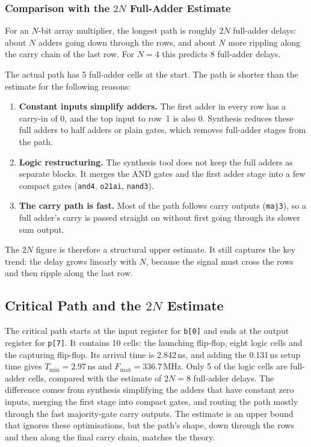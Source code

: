 \documentclass[11pt,a4paper]{article}
\begin{document}
\subsubsection{Comparison with the $2N$ Full-Adder Estimate}

For an $N$-bit array multiplier, the longest path is roughly $2N$ full-adder
delays: about $N$ adders going down through the rows, and about $N$ more
rippling along the carry chain of the last row. For $N = 4$ this predicts
8 full-adder delays.

The actual path has 5 full-adder cells at the start. The path is shorter than the estimate for the following reasons:
\begin{enumerate}
  \item \textbf{Constant inputs simplify adders.} The first adder in every
        row has a carry-in of 0, and the top input to row~1 is also 0.
        Synthesis reduces these full adders to half adders or plain gates,
        which removes full-adder stages from the path.
  \item \textbf{Logic restructuring.} The synthesis tool does not keep the
        full adders as separate blocks. It merges the AND gates and the first
        adder stage into a few compact gates (\texttt{and4},
        \texttt{o21ai}, \texttt{nand3}).
  \item \textbf{The carry path is fast.} Most of the path follows carry
        outputs (\texttt{maj3}), so a full adder's carry is passed straight
        on without first going through its slower sum output.
\end{enumerate}

The $2N$ figure is therefore a structural upper estimate. It still captures
the key trend: the delay grows linearly with $N$, because the signal must
cross the rows and then ripple along the last row.

\subsection{Critical Path and the $2N$ Estimate}

The critical path starts at the input register for \texttt{b[0]} and ends at
the output register for \texttt{p[7]}. It contains 10 cells: the launching
flip-flop, eight logic cells and the capturing flip-flop. Its
arrival time is 2.842\,ns, and adding the 0.131\,ns setup time gives
$T_{\min} = 2.97$\,ns and $F_{\max} = 336.7$\,MHz. Only 5 of the logic cells are
full-adder cells, compared with the estimate of $2N = 8$ full-adder delays.
The difference comes from synthesis simplifying the adders that have constant
zero inputs, merging the first stage into compact gates, and routing the path
mostly through the fast majority-gate carry outputs. The estimate is an upper
bound that ignores these optimisations, but the path's shape, down through
the rows and then along the final carry chain, matches the theory.
\end{document}
